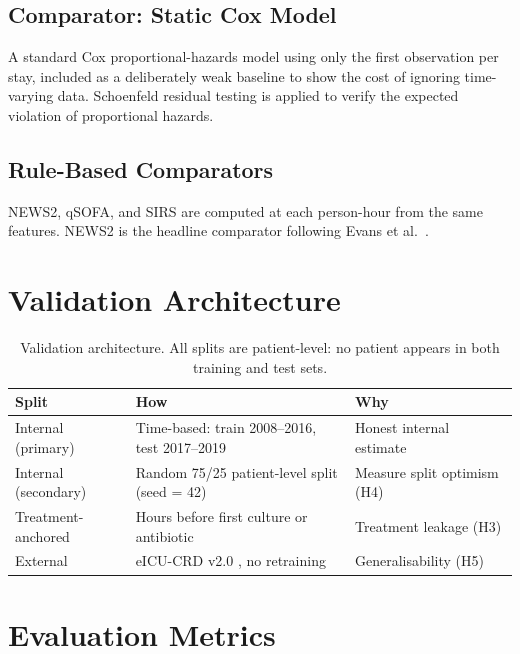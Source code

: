 \subsection{Comparator: Static Cox Model}

A standard Cox proportional-hazards model using only the first observation per
stay, included as a deliberately weak baseline to show the cost of ignoring
time-varying data. Schoenfeld residual testing is applied to verify the expected
violation of proportional hazards.

\subsection{Rule-Based Comparators}

NEWS2, qSOFA, and SIRS are computed at each person-hour from the same features.
NEWS2 is the headline comparator following Evans et al.\
\cite{evans2021ssc}.


\section{Validation Architecture}
\label{sec:validation}

\begin{table}[H]
    \centering\small
    \begin{tabular}{p{2.8cm}p{6.5cm}p{3.5cm}}
        \toprule
        \textbf{Split} & \textbf{How} & \textbf{Why} \\
        \midrule
        Internal (primary) & Time-based: train 2008--2016, test 2017--2019
        \cite{guo2022temporal} & Honest internal estimate \\
        Internal (secondary) & Random 75/25 patient-level split (seed = 42)
        & Measure split optimism (H4) \\
        Treatment-anchored & Hours before first culture or antibiotic
        \cite{kamran2024evaluation} & Treatment leakage (H3) \\
        External & eICU-CRD v2.0 \cite{pollard2018eicu}, no retraining
        & Generalisability (H5) \\
        \bottomrule
    \end{tabular}
    \caption{Validation architecture. All splits are patient-level: no patient
    appears in both training and test sets.}
    \label{tab:validation}
\end{table}


\section{Evaluation Metrics}
\label{sec:metrics}

